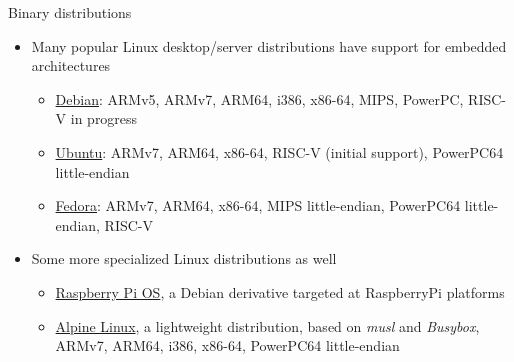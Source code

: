 \begin{frame}{Binary distributions}
  \begin{itemize}
  \item Many popular Linux desktop/server distributions have support
    for embedded architectures
    \begin{itemize}
    \item \href{https://www.debian.org}{Debian}: ARMv5, ARMv7, ARM64,
      i386, x86-64, MIPS, PowerPC, RISC-V in progress
    \item \href{https://www.ubuntu.com}{Ubuntu}: ARMv7, ARM64,
      x86-64, RISC-V (initial support), PowerPC64 little-endian
    \item \href{https://getfedora.org}{Fedora}: ARMv7, ARM64, x86-64,
      MIPS little-endian, PowerPC64 little-endian, RISC-V
    \end{itemize}
  \item Some more specialized Linux distributions as well
    \begin{itemize}
    \item \href{https://www.raspberrypi.com/software/}{Raspberry Pi
        OS}, a Debian derivative targeted at RaspberryPi platforms
    \item \href{https://www.alpinelinux.org/}{Alpine Linux}, a
      lightweight distribution, based on {\em musl} and {\em Busybox},
      ARMv7, ARM64, i386, x86-64, PowerPC64 little-endian
    \end{itemize}
  \end{itemize}
\end{frame}

